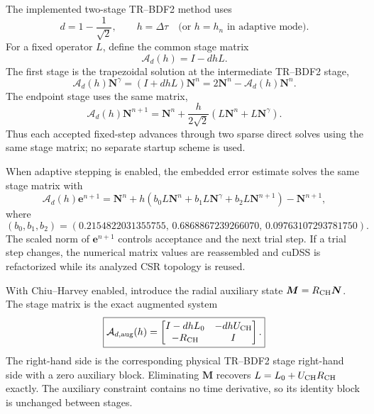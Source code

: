 \documentclass[11pt]{article}
\begin{document}
The implemented two-stage TR--BDF2 method uses
\begin{equation}
 d=1-\frac{1}{\sqrt{2}},\qquad h=\Delta\tau
 \quad\text{(or }h=h_n\text{ in adaptive mode)}.
 \label{eq:trbdf2_parameter}
\end{equation}
For a fixed operator $L$, define the common stage matrix
\begin{equation}
 \mathcal A_d(h)=I-dhL.
 \label{eq:trbdf2_stage_matrix}
\end{equation}
The first stage is the trapezoidal solution at the intermediate TR--BDF2 stage,
\begin{equation}
 \boxed{
 \mathcal A_d(h)\bm N^\gamma
 =\left(I+dhL\right)\bm N^n
 =2\bm N^n-\mathcal A_d(h)\bm N^n.
 }
 \label{eq:trbdf2_stage1}
\end{equation}
The endpoint stage uses the same matrix,
\begin{equation}
 \boxed{
 \mathcal A_d(h)\bm N^{n+1}
 =\bm N^n+\frac{h}{2\sqrt{2}}
   \left(L\bm N^n+L\bm N^\gamma\right).
 }
 \label{eq:trbdf2_stage2}
\end{equation}
Thus each accepted fixed-step advances through two sparse direct solves using the same
stage matrix; no separate startup scheme is used.

When adaptive stepping is enabled, the embedded error estimate solves the same stage
matrix with
\begin{equation}
 \mathcal A_d(h)\bm e^{n+1}
 =\bm N^n+h\left(
 b_0L\bm N^n+b_1L\bm N^\gamma+b_2L\bm N^{n+1}
 \right)-\bm N^{n+1},
 \label{eq:trbdf2_error}
\end{equation}
where
\begin{equation}
 (b_0,b_1,b_2)=
 (0.2154822031355755,\,0.6868867239266070,\,0.09763107293781750).
 \label{eq:trbdf2_error_weights}
\end{equation}
The scaled norm of $\bm e^{n+1}$ controls acceptance and the next trial step.  If a
trial step changes, the numerical matrix values are reassembled and cuDSS is
refactorized while its analyzed CSR topology is reused.

With Chiu--Harvey enabled, introduce the radial auxiliary state
$\bm M=R_{\rm CH}\bm N$.  The stage matrix is the exact augmented system
\begin{equation}
 \boxed{
 \mathcal A_{d,\rm aug}(h)=
 \begin{bmatrix}
  I-dhL_0 & -dhU_{\rm CH}\\
  -R_{\rm CH} & I
 \end{bmatrix}.
 }
 \label{eq:trbdf2_augmented_matrix}
\end{equation}
The right-hand side is the corresponding physical TR--BDF2 stage right-hand side
with a zero auxiliary block.  Eliminating $\bm M$ recovers
$L=L_0+U_{\rm CH}R_{\rm CH}$ exactly.  The auxiliary constraint contains no time
derivative, so its identity block is unchanged between stages.
\end{document}
